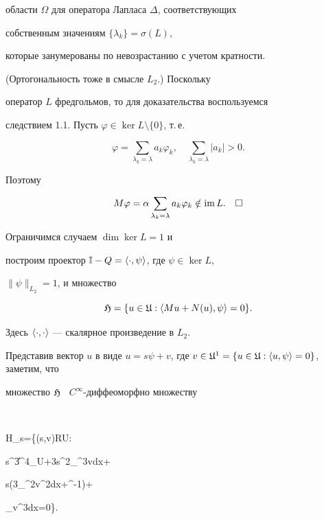 области $\Omega$ для оператора Лапласа $\Delta$, соответствующих


собственным значениям $\{\lambda_{k}\}=\sigma(L)$,


которые занумерованы по невозрастанию с учетом кратности.


(Ортогональность тоже в смысле $L_{2}$.) Поскольку


оператор $L$ фредгольмов, то для доказательства воспользуемся


следствием 1.1. Пусть $\varphi\in\ker L\setminus\{0 \}$, т.\,е.


$$


\varphi=\sum_{\lambda_{k}=\lambda}a_{k}\varphi_{k},\quad


\sum_{\lambda_{k}=\lambda}|a_{k}|>0.


$$


Поэтому


$$


M\varphi=\alpha\sum_{\lambda_{k}=\lambda}a_{k}\varphi_{k}\notin


\im L.\quad\square


$$





Ограничимся случаем $\dim\ker L=1$ и


построим проектор $\Bbb I -Q=\langle\cdot,\psi\rangle$, где $\psi\in\ker L$,


$\|\psi\|_{L_{2}}=1$, и множество


$$


\frak H=\{u\in\frak U:\la Mu+N(u),\psi\ra=0\}.


$$


Здесь $\langle\cdot,\cdot\rangle$ --- скалярное произведение в $L_{2}$.





Представив вектор $u$ в виде $u=s\psi+v$, где $v\in\frak


U^{1}=\{u\in\frak U:\la u,\psi\ra=0\}$, заметим, что 


множество $\frak H$ \ $C^{\infty}$-диффеоморфно множеству


$$


\frak H_{s}=\bigg\{(s,v)\in\Bbb R\times\frak U:


s^{3}\|\psi\|^{4}_{\frak U}+3s^{2}\int_{\Omega}\psi^{3}vdx+


s\bigg(3\int_{\Omega}\psi^{2}v^{2}dx+\alpha\beta^{-1}\bigg)+


\int_{\Omega}\psi v^{3}dx=0\bigg\}.


